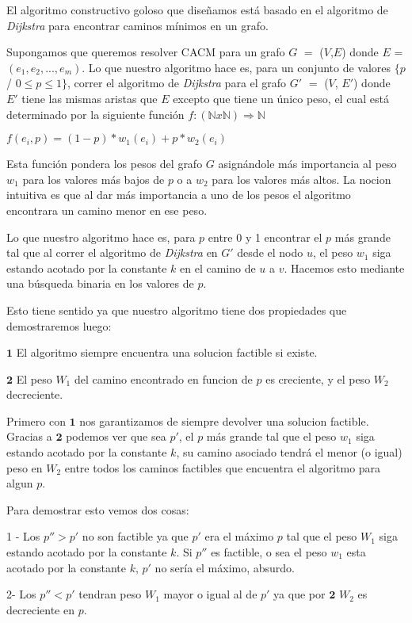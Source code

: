 El algoritmo constructivo goloso que diseñamos está basado en el algoritmo de \emph{Dijkstra} para encontrar caminos mínimos en un grafo. 

Supongamos que queremos resolver CACM para un grafo $G$ $=$ ($V$,$E$) donde $E$ = $(e_1, e_2, ..., e_m)$. Lo que nuestro algoritmo hace es, para un conjunto de valores $\{p$ / $0 \leq p \leq 1\}$, correr el algoritmo de \emph{Dijkstra} para el grafo $G'$ $=$ ($V$, $E'$) donde $E'$ tiene las mismas aristas que $E$ excepto que tiene un único peso, el cual está determinado por la siguiente función $f: (\mathbb{N} x \mathbb{N}) \Rightarrow \mathbb{N}$

$f(e_i,p) = (1-p)*w_1(e_i) + p*w_2(e_i)$

Esta función pondera los pesos del grafo $G$ asignándole más importancia al peso $w_1$ para los valores más bajos de $p$ o a $w_2$ para los valores más altos. La nocion intuitiva es que al dar m\'as importancia a uno de los pesos el algoritmo encontrara un camino menor en ese peso.

Lo que nuestro algoritmo hace es, para $p$ entre 0 y 1 encontrar el $p$ más grande tal que al correr el algoritmo de \emph{Dijkstra} en $G'$ desde el nodo $u$, el peso $w_1$ siga estando acotado por la constante $k$ en el camino de $u$ a $v$. Hacemos esto mediante una búsqueda binaria en los valores de $p$.

Esto tiene sentido ya que nuestro algoritmo tiene dos propiedades que demostraremos luego:

$\mathbf{1}$ El algoritmo siempre encuentra una solucion factible si existe.

$\mathbf{2}$ El peso $W_1$ del camino encontrado en funcion de $p$ es creciente, y el peso $W_2$ decreciente.

Primero con $\mathbf{1}$ nos garantizamos de siempre devolver una solucion factible.
Gracias a $\mathbf{2}$ podemos ver que sea $p'$, el $p$ más grande tal que el peso $w_1$ siga estando acotado por la constante $k$, su camino asociado tendrá el menor (o igual) peso en $W_2$ entre todos los caminos factibles que encuentra el algoritmo para algun $p$.

Para demostrar esto vemos dos cosas:

1 - Los $p'' > p'$ no son factible ya que $p'$ era el m\'aximo $p$  tal que el peso $W_1$ siga estando acotado por la constante $k$. Si $p''$ es factible, o sea el peso $w_1$ esta acotado por la constante $k$, $p'$ no ser\'ia el m\'aximo, absurdo.

2- Los $p'' < p'$ tendran peso $W_1$ mayor o igual al de $p'$ ya que por $\mathbf{2}$ $W_2$ es decreciente en $p$.


